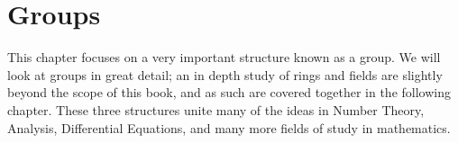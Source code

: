 \chapter{Groups}

This chapter focuses on a very important structure known as a group. We will look at groups in great detail; an in depth study of rings and fields are slightly beyond the scope of this book, and as such are covered together in the following chapter. These three structures unite many of the ideas in Number Theory, Analysis, Differential Equations, and many more fields of study in mathematics.





